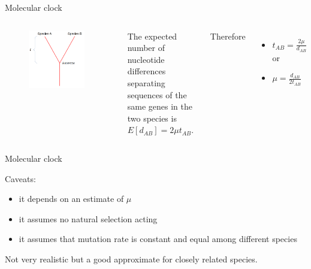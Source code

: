 \begin{frame}{Molecular clock}

	\begin{columns}


                \begin{figure}
                        \includegraphics[width=0.9\textwidth]{Pics/divergence}
                \end{figure}

		\small
		The expected number of nucleotide differences separating sequences of the same genes in the two species is $E[d_{AB}] = 2 \mu t_{AB}$.
		
		\bigskip

		Therefore
		\begin{itemize}
			\item $t_{AB}=\frac{2\mu}{d_{AB}}$ or
			\item $\mu = \frac{d_{AB}}{2t_{AB}}$
		\end{itemize}

        \end{columns}

\end{frame}


\begin{frame}{Molecular clock}

	Caveats:
	\begin{itemize}
		\item it depends on an estimate of $\mu$
		\item it assumes no natural selection acting
		\item it assumes that mutation rate is constant and equal among different species
	\end{itemize}

	\bigskip
	Not very realistic but a good approximate for closely related species.

\end{frame}


